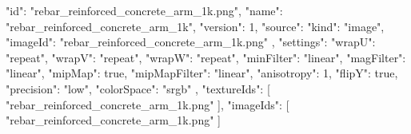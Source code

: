 {
  "id": "rebar_reinforced_concrete_arm_1k.png",
  "name": "rebar_reinforced_concrete_arm_1k",
  "version": 1,
  "source": {
    "kind": "image",
    "imageId": "rebar_reinforced_concrete_arm_1k.png"
  },
  "settings": {
    "wrapU": "repeat",
    "wrapV": "repeat",
    "wrapW": "repeat",
    "minFilter": "linear",
    "magFilter": "linear",
    "mipMap": true,
    "mipMapFilter": "linear",
    "anisotropy": 1,
    "flipY": true,
    "precision": "low",
    "colorSpace": "srgb"
  },
  "textureIds": [
    "rebar_reinforced_concrete_arm_1k.png"
  ],
  "imageIds": [
    "rebar_reinforced_concrete_arm_1k.png"
  ]
}
